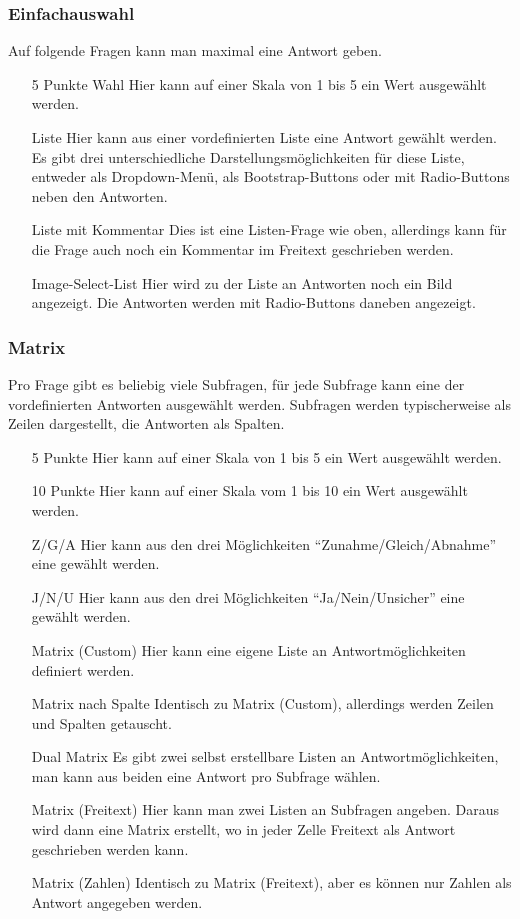 \subsubsection{Einfachauswahl}

Auf folgende Fragen kann man maximal eine Antwort geben.
\begin{itemize}
	\item[5 Punkte Wahl] Hier kann auf einer Skala von 1 bis 5 ein Wert ausgewählt werden.
	\item[Liste] Hier kann aus einer vordefinierten Liste eine Antwort gewählt werden. Es gibt drei unterschiedliche Darstellungsmöglichkeiten für diese Liste, entweder als Dropdown-Menü, als Bootstrap-Buttons oder mit Radio-Buttons neben den Antworten.
	\item[Liste mit Kommentar] Dies ist eine Listen-Frage wie oben, allerdings kann für die Frage auch noch ein Kommentar im Freitext geschrieben werden.
	\item[Image-Select-List] Hier wird zu der Liste an Antworten noch ein Bild angezeigt. Die Antworten werden mit Radio-Buttons daneben angezeigt.
\end{itemize}

\subsubsection{Matrix}

Pro Frage gibt es beliebig viele Subfragen, für jede Subfrage kann eine der vordefinierten Antworten ausgewählt werden.
Subfragen werden typischerweise als Zeilen dargestellt, die Antworten als Spalten.

\begin{itemize}
	\item[5 Punkte] Hier kann auf einer Skala von 1 bis 5 ein Wert ausgewählt werden.
	\item[10 Punkte] Hier kann auf einer Skala vom 1 bis 10 ein Wert ausgewählt werden.
	\item[Z/G/A] Hier kann aus den drei Möglichkeiten \enquote{Zunahme/Gleich/Abnahme} eine gewählt werden.
	\item[J/N/U] Hier kann aus den drei Möglichkeiten \enquote{Ja/Nein/Unsicher} eine gewählt werden.
	\item[Matrix (Custom)] Hier kann eine eigene Liste an Antwortmöglichkeiten definiert werden.
	\item[Matrix nach Spalte] Identisch zu Matrix (Custom), allerdings werden Zeilen und Spalten getauscht.
	\item[Dual Matrix] Es gibt zwei selbst erstellbare Listen an Antwortmöglichkeiten, man kann aus beiden eine Antwort pro Subfrage wählen.
	\item[Matrix (Freitext)] Hier kann man zwei Listen an Subfragen angeben. Daraus wird dann eine Matrix erstellt, wo in jeder Zelle Freitext als Antwort geschrieben werden kann.
	\item[Matrix (Zahlen)] Identisch zu Matrix (Freitext), aber es können nur Zahlen als Antwort angegeben werden.
\end{itemize}

